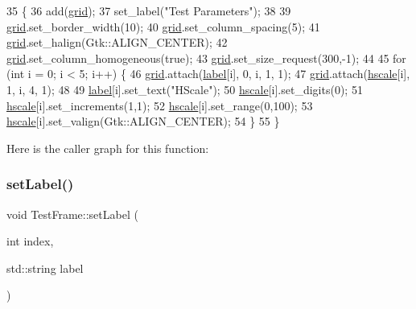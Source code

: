\begin{DoxyCode}
35                      \{
36     add(\hyperlink{class_test_frame_a8db1fcde1fac654bd8e6bd947da2dd10}{grid});
37     set\_label(\textcolor{stringliteral}{"Test Parameters"});
38 
39     \hyperlink{class_test_frame_a8db1fcde1fac654bd8e6bd947da2dd10}{grid}.set\_border\_width(10);
40     \hyperlink{class_test_frame_a8db1fcde1fac654bd8e6bd947da2dd10}{grid}.set\_column\_spacing(5);
41     \hyperlink{class_test_frame_a8db1fcde1fac654bd8e6bd947da2dd10}{grid}.set\_halign(Gtk::ALIGN\_CENTER);
42     \hyperlink{class_test_frame_a8db1fcde1fac654bd8e6bd947da2dd10}{grid}.set\_column\_homogeneous(\textcolor{keyword}{true});
43     \hyperlink{class_test_frame_a8db1fcde1fac654bd8e6bd947da2dd10}{grid}.set\_size\_request(300,-1);
44 
45     \textcolor{keywordflow}{for} (\textcolor{keywordtype}{int} i = 0; i < 5; i++) \{
46         \hyperlink{class_test_frame_a8db1fcde1fac654bd8e6bd947da2dd10}{grid}.attach(\hyperlink{class_test_frame_a0fb8c663f048dc69899409a61bd22025}{label}[i], 0, i, 1, 1);
47         \hyperlink{class_test_frame_a8db1fcde1fac654bd8e6bd947da2dd10}{grid}.attach(\hyperlink{class_test_frame_ac85dadacc49bc00afc3df6c60635c1e3}{hscale}[i], 1, i, 4, 1);
48 
49         \hyperlink{class_test_frame_a0fb8c663f048dc69899409a61bd22025}{label}[i].set\_text(\textcolor{stringliteral}{"HScale"});
50         \hyperlink{class_test_frame_ac85dadacc49bc00afc3df6c60635c1e3}{hscale}[i].set\_digits(0);
51         \hyperlink{class_test_frame_ac85dadacc49bc00afc3df6c60635c1e3}{hscale}[i].set\_increments(1,1);
52         \hyperlink{class_test_frame_ac85dadacc49bc00afc3df6c60635c1e3}{hscale}[i].set\_range(0,100);
53         \hyperlink{class_test_frame_ac85dadacc49bc00afc3df6c60635c1e3}{hscale}[i].set\_valign(Gtk::ALIGN\_CENTER);
54     \}
55 \}
\end{DoxyCode}
Here is the caller graph for this function\+:
\mbox{\label{class_test_frame_a125817ea431fb013eaf2b9f11714bd9b}} 
\subsubsection{\texorpdfstring{set\+Label()}{setLabel()}}
{\footnotesize\ttfamily void Test\+Frame\+::set\+Label (\begin{DoxyParamCaption}\item[{int}]{index,  }\item[{std\+::string}]{label }\end{DoxyParamCaption})}



